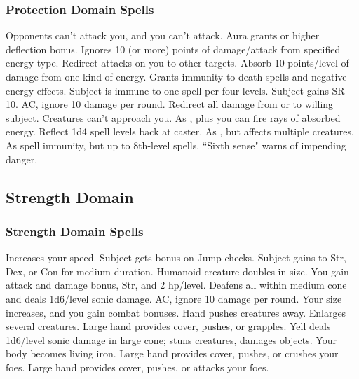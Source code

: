 \subsubsection{Protection Domain Spells}
\begin{spelllist}
 Opponents can't attack you, and you can't attack.
 Aura grants  or higher deflection bonus.
 Ignores 10 (or more) points of damage/attack from specified energy type.
\spellhead[2]{}
 Redirect attacks on you to other targets.
 Absorb 10 points/level of damage from one kind of energy.
 Grants immunity to death spells and negative energy effects.
 Subject is immune to one spell per four levels.
 Subject gains SR 10.
  AC, ignore 10 damage per round.
 Redirect all damage from or to willing subject.
 Creatures can't approach you.
 As , plus you can fire rays of absorbed energy.
 Reflect 1d4 spell levels back at caster.
 As , but affects multiple creatures.
 As spell immunity, but up to 8th-level spells.
 ``Sixth sense" warns of impending danger.
\spellhead[9]{}
\end{spelllist}

\subsection{Strength Domain}

\subsubsection{Strength Domain Spells}
\begin{spelllist}
 Increases your speed.
 Subject gets bonus on Jump checks.
 Subject gains  to Str, Dex, or Con for medium duration.
\spellhead[2]{}
 Humanoid creature doubles in size.
 You gain attack and damage bonus,  Str, and 2 hp/level.
 Deafens all within medium cone and deals 1d6/level sonic damage.
  AC, ignore 10 damage per round.
 Your size increases, and you gain combat bonuses.
 Hand pushes creatures away.
 Enlarges several creatures.
 Large hand provides cover, pushes, or grapples.
 Yell deals 1d6/level sonic damage in large cone; stuns creatures, damages objects.
 Your body becomes living iron.
 Large hand provides cover, pushes, or crushes your foes.
 Large hand provides cover, pushes, or attacks your foes.
\spellhead[9]{} 
\end{spelllist}


